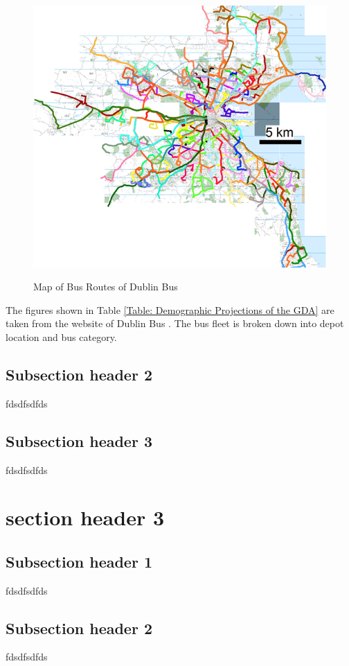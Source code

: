 \begin{figure}[htbp]
    \center \includegraphics[width=400pt]{./image/intro2}\\
    \caption{Map of Bus Routes of Dublin Bus} \label{fig2: Map of bus routes provided by Dublin Bus}
\end{figure}

The figures shown in Table \ref{Table: Demographic Projections of the GDA} are
taken from the website of Dublin Bus \citep{DUB05}. The bus fleet is broken
down into depot location and bus category.

\subsection{Subsection header 2}
fdsdfsdfds
\subsection{Subsection header 3}
fdsdfsdfds

\section{section header 3}

\subsection{Subsection header 1}
fdsdfsdfds
\subsection{Subsection header 2}
fdsdfsdfds
